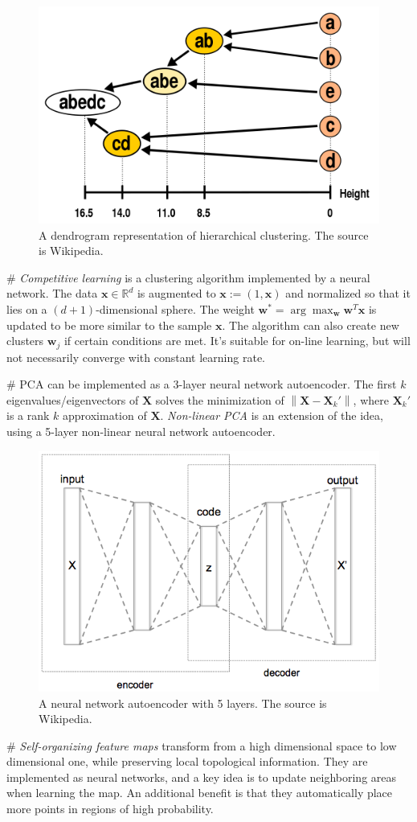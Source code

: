 \documentclass[12pt, a4paper]{article}
\newcommand{\R}{\mathbb{R}}
\newcommand{\vect}[1]{\bm{#1}}
\newcommand{\norm}[1]{\left\lVert#1\right\rVert}
\begin{document}
\begin{easylist}[itemize]
\begin{figure}[ht!]
	\centering
	\includegraphics[width=0.5\linewidth]{figs/dendrogram}
	\caption{A dendrogram representation of hierarchical clustering. The source is Wikipedia.}
	\label{fig:dendrogram}
\end{figure}

# \emph{Competitive learning} is a clustering algorithm implemented by a neural network.
The data $\vect{x} \in \R^d$ is augmented to $\vect{x} := (1, \vect{x})$ and normalized so that it lies on a $(d+1)$-dimensional sphere.
The weight $\vect{w}^* = \arg \max_{\vect{w}} \vect{w}^T \vect{x}$ is updated to be more similar to the sample $\vect{x}$.
The algorithm can also create new clusters $\vect{w}_j$ if certain conditions are met.
It's suitable for on-line learning, but will not necessarily converge with constant learning rate.

# PCA can be implemented as a 3-layer neural network autoencoder.
The first $k$ eigenvalues/eigenvectors of $\vect{X}$ solves the minimization of $\norm{\vect{X} - \vect{X}_k'}$, where $\vect{X}_k'$ is a rank $k$ approximation of $\vect{X}$.
\emph{Non-linear PCA} is an extension of the idea, using a 5-layer non-linear neural network autoencoder.

\begin{figure}[ht!]
	\centering
	\includegraphics[width=0.55\linewidth]{figs/autoencoder}
	\caption{A neural network autoencoder with 5 layers. The source is Wikipedia.}
	\label{fig:autoencoder}
\end{figure}

# \emph{Self-organizing feature maps} transform from a high dimensional space to low dimensional one, while preserving local topological information.
They are implemented as neural networks, and a key idea is to update neighboring areas when learning the map.
An additional benefit is that they automatically place more points in regions of high probability.
\end{easylist}
\end{document}
